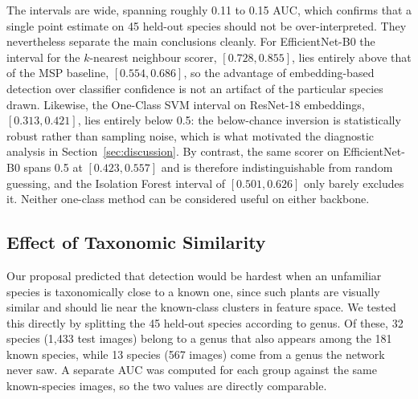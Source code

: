 \documentclass[11pt]{article}
\begin{document}
The intervals are wide, spanning roughly 0.11 to 0.15 AUC, which confirms that a single point estimate on 45 held-out species should not be over-interpreted. They nevertheless separate the main conclusions cleanly. For EfficientNet-B0 the interval for the $k$-nearest neighbour scorer, $[0.728, 0.855]$, lies entirely above that of the MSP baseline, $[0.554, 0.686]$, so the advantage of embedding-based detection over classifier confidence is not an artifact of the particular species drawn. Likewise, the One-Class SVM interval on ResNet-18 embeddings, $[0.313, 0.421]$, lies entirely below 0.5: the below-chance inversion is statistically robust rather than sampling noise, which is what motivated the diagnostic analysis in Section~\ref{sec:discussion}. By contrast, the same scorer on EfficientNet-B0 spans 0.5 at $[0.423, 0.557]$ and is therefore indistinguishable from random guessing, and the Isolation Forest interval of $[0.501, 0.626]$ only barely excludes it. Neither one-class method can be considered useful on either backbone.

\subsection{Effect of Taxonomic Similarity}
\label{sec:taxonomy}

Our proposal predicted that detection would be hardest when an unfamiliar species is taxonomically close to a known one, since such plants are visually similar and should lie near the known-class clusters in feature space. We tested this directly by splitting the 45 held-out species according to genus. Of these, 32 species (1,433 test images) belong to a genus that also appears among the 181 known species, while 13 species (567 images) come from a genus the network never saw. A separate AUC was computed for each group against the same known-species images, so the two values are directly comparable.
\end{document}
